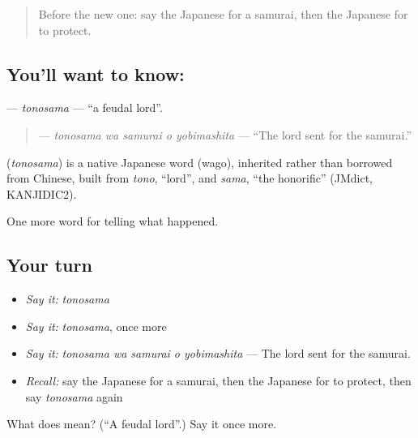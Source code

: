 \label{lesson:JA-C299-tonosama}



\begin{quote}
Before the new one: say the Japanese for a samurai, then the Japanese for to protect.
\end{quote}

\subsection*{You'll want to know: }
\textbf{} — \emph{tonosama} — \textquotedblleft{}a feudal lord\textquotedblright{}.

\begin{quote}
\textbf{  } — \emph{tonosama wa samurai o yobimashita} — \textquotedblleft{}The lord sent for the samurai.\textquotedblright{}
\end{quote}

\begin{cousinweb}
\textbf{} (\emph{tonosama}) is a native Japanese word (wago), inherited rather than borrowed from Chinese, built from \emph{tono}, \textquotedblleft{}lord\textquotedblright{}, and \emph{sama}, \textquotedblleft{}the honorific\textquotedblright{} (JMdict, KANJIDIC2).
\end{cousinweb}

\begin{grammarlens}[title={What you've built}]
One more word for telling what happened.
\end{grammarlens}

\subsection*{Your turn}
\begin{itemize}
\raggedright
  \item \emph{Say it:} \emph{tonosama}
  \item \emph{Say it:} \emph{tonosama}, once more
  \item \emph{Say it:} \emph{tonosama wa samurai o yobimashita} — The lord sent for the samurai.
  \item \emph{Recall:} say the Japanese for a samurai, then the Japanese for to protect, then say \emph{tonosama} again
\end{itemize}

\begin{tcolorbox}[breakable,colback=teal!4,colframe=teal!35!black,title={Before you move on}]
What does  mean? (\textquotedblleft{}A feudal lord\textquotedblright{}.) Say it once more.
\end{tcolorbox}
